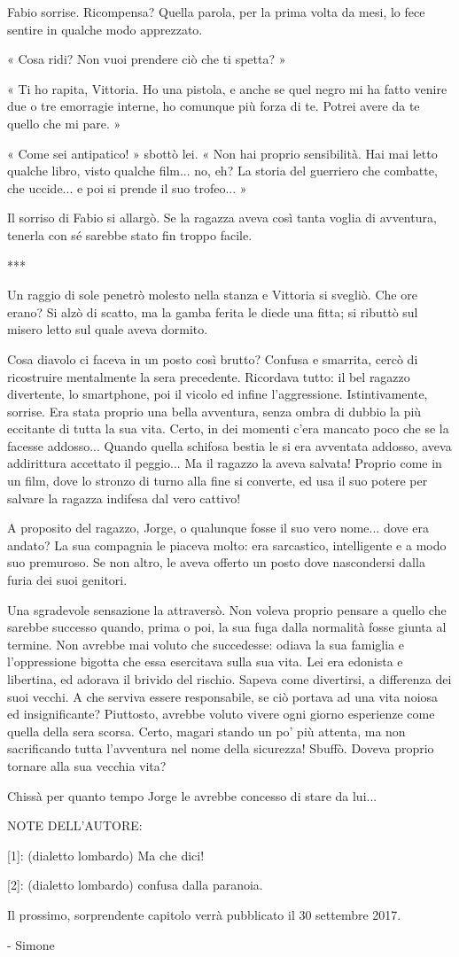Fabio sorrise. Ricompensa? Quella parola, per la prima volta da mesi, lo fece sentire in qualche modo apprezzato.

« Cosa ridi? Non vuoi prendere ciò che ti spetta? »

« Ti ho rapita, Vittoria. Ho una pistola, e anche se quel negro mi ha fatto venire due o tre emorragie interne, ho comunque più forza di te. Potrei avere da te quello che mi pare. »

« Come sei antipatico! » sbottò lei. « Non hai proprio sensibilità. Hai mai letto qualche libro, visto qualche film... no, eh? La storia del guerriero che combatte, che uccide... e poi si prende il suo trofeo... »

Il sorriso di Fabio si allargò. Se la ragazza aveva così tanta voglia di avventura, tenerla con sé sarebbe stato fin troppo facile.

***

Un raggio di sole penetrò molesto nella stanza e Vittoria si svegliò. Che ore erano? Si alzò di scatto, ma la gamba ferita le diede una fitta; si ributtò sul misero letto sul quale aveva dormito.

Cosa diavolo ci faceva in un posto così brutto? Confusa e smarrita, cercò di ricostruire mentalmente la sera precedente. Ricordava tutto: il bel ragazzo divertente, lo smartphone, poi il vicolo ed infine l'aggressione. Istintivamente, sorrise. Era stata proprio una bella avventura, senza ombra di dubbio la più eccitante di tutta la sua vita. Certo, in dei momenti c'era mancato poco che se la facesse addosso... Quando quella schifosa bestia le si era avventata addosso, aveva addirittura accettato il peggio... Ma il ragazzo la aveva salvata! Proprio come in un film, dove lo stronzo di turno alla fine si converte, ed usa il suo potere per salvare la ragazza indifesa dal vero cattivo!

A proposito del ragazzo, Jorge, o qualunque fosse il suo vero nome... dove era andato? La sua compagnia le piaceva molto: era sarcastico, intelligente e a modo suo premuroso. Se non altro, le aveva offerto un posto dove nascondersi dalla furia dei suoi genitori.

Una sgradevole sensazione la attraversò. Non voleva proprio pensare a quello che sarebbe successo quando, prima o poi, la sua fuga dalla normalità fosse giunta al termine. Non avrebbe mai voluto che succedesse: odiava la sua famiglia e l'oppressione bigotta che essa esercitava sulla sua vita. Lei era edonista e libertina, ed adorava il brivido del rischio. Sapeva come divertirsi, a differenza dei suoi vecchi. A che serviva essere responsabile, se ciò portava ad una vita noiosa ed insignificante? Piuttosto, avrebbe voluto vivere ogni giorno esperienze come quella della sera scorsa. Certo, magari stando un po' più attenta, ma non sacrificando tutta l'avventura nel nome della sicurezza! Sbuffò. Doveva proprio tornare alla sua vecchia vita?

Chissà per quanto tempo Jorge le avrebbe concesso di stare da lui...


NOTE DELL'AUTORE:

[1]: (dialetto lombardo) Ma che dici!

[2]: (dialetto lombardo) confusa dalla paranoia.


Il prossimo, sorprendente capitolo verrà pubblicato il 30 settembre 2017.

- Simone



